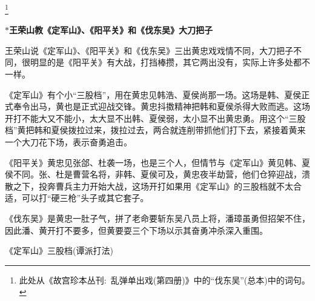 {





\footnote{此处从《故宫珍本丛刊:~乱弹单出戏(第四册)》中的``伐东吴''(总本)中的词句。}


}
\vspace{15pt}
$\ast${\bfseries\hwfs 王荣山教《定军山》、《阳平关》和《伐东吴》大刀把子}

王荣山说《定军山》、《阳平关》和《伐东吴》三出黄忠戏戏情不同，大刀把子不同，很明显的是《阳平关》有大战，打挡棒攒，其它两出没有，实际上许多处都不一样。

《定军山》有个小``三股档''，用在黄忠见韩浩、夏侯尚那一场。这场是韩、夏侯正式奉令出马，黄也是正式迎战交锋。黄忠抖擞精神把韩和夏侯杀得大败而逃。这场开打不能大又不能小，太大显不出韩、夏侯弱，太小显不出黄忠勇。用这个``三股档''黄把韩和夏侯拨拉过来，拨拉过去，两合就连削带抓他们打下去，紧接着黄来一个大刀花下场，表示奋勇追击。

《阳平关》黄忠见张郃、杜袭一场，也是三个人，但情节与《定军山》黄见韩、夏侯不同。张、杜是曹营名将，非韩、夏侯可及，黄忠夜半劫营，他们仓猝迎战，溃散之下，投奔曹兵主力开始大战，这场开打如果用《定军山》的三股档就不太合适，可以打``硬三枪''头子或其它套子。

《伐东吴》是黄忠一肚子气，拼了老命要斩东吴八员上将，潘璋虽勇但招架不住，因此潘、黄开打不要多，但黄要耍三个下场以示其奋勇冲杀深入重围。

《定军山》三股档(谭派打法)


